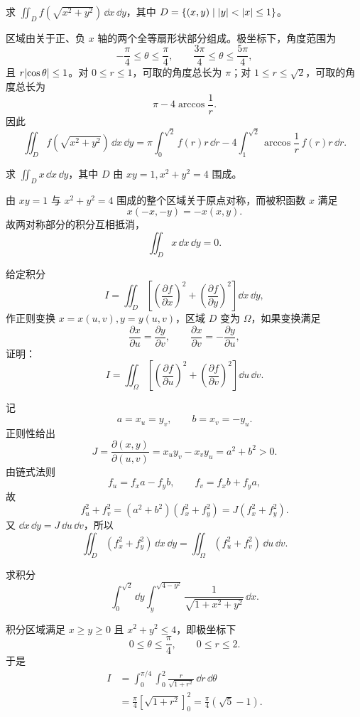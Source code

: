 \begin{xexercise}[11]
求 $\displaystyle\iint_D f(\sqrt{x^2+y^2})\,\dd x\,\dd y$，其中 $D=\{(x,y)\mid\lvert y\rvert<\lvert x\rvert\le1\}$。
\end{xexercise}
\begin{xsolution}
区域由关于正、负 $x$ 轴的两个全等扇形状部分组成。极坐标下，角度范围为
\[
 -\frac\pi4\le\theta\le\frac\pi4,
 \qquad
 \frac{3\pi}{4}\le\theta\le\frac{5\pi}{4},
\]
且 $r\lvert\cos\theta\rvert\le1$。对 $0\le r\le1$，可取的角度总长为 $\pi$；对 $1\le r\le\sqrt2$，可取的角度总长为
\[
  \pi-4\arccos\frac1r.
\]
因此
\[
 \boxed{
 \iint_Df(\sqrt{x^2+y^2})\,\dd x\,\dd y
 =\pi\int_0^{\sqrt2}f(r)r\,\dd r
 -4\int_1^{\sqrt2}\arccos\frac1r\,f(r)r\,\dd r }.
\]
\end{xsolution}


\begin{xexercise}[12]
求 $\displaystyle\iint_D x\,\dd x\,\dd y$，其中 $D$ 由 $xy=1,x^2+y^2=4$ 围成。
\end{xexercise}
\begin{xsolution}
由 $xy=1$ 与 $x^2+y^2=4$ 围成的整个区域关于原点对称，而被积函数 $x$ 满足
\[
  x(-x,-y)=-x(x,y).
\]
故两对称部分的积分互相抵消，
\[
  \boxed{\iint_Dx\,\dd x\,\dd y=0}.
\]
\end{xsolution}


\begin{xexercise}[13]
给定积分
  \[
    I=\iint_D\left[\left(\frac{\partial f}{\partial x}\right)^2+\left(\frac{\partial f}{\partial y}\right)^2\right]\dd x\,\dd y,
  \]
  作正则变换 $x=x(u,v),y=y(u,v)$，区域 $D$ 变为 $\Omega$，如果变换满足
  \[
    \frac{\partial x}{\partial u}=\frac{\partial y}{\partial v},\qquad
    \frac{\partial x}{\partial v}=-\frac{\partial y}{\partial u},
  \]
  证明：
  \[
    I=\iint_\Omega\left[\left(\frac{\partial f}{\partial u}\right)^2+\left(\frac{\partial f}{\partial v}\right)^2\right]\dd u\,\dd v.
  \]
\end{xexercise}
\begin{xsolution}
记
\[
 a=x_u=y_v,
 \qquad b=x_v=-y_u.
\]
正则性给出
\[
 J=\frac{\partial(x,y)}{\partial(u,v)}=x_uy_v-x_vy_u=a^2+b^2>0.
\]
由链式法则
\[
 f_u=f_xa-f_yb,
 \qquad
 f_v=f_xb+f_ya,
\]
故
\[
 f_u^2+f_v^2=(a^2+b^2)(f_x^2+f_y^2)=J(f_x^2+f_y^2).
\]
又 $\dd x\,\dd y=J\,\dd u\,\dd v$，所以
\[
 \iint_D(f_x^2+f_y^2)\,\dd x\,\dd y
 =\iint_\Omega(f_u^2+f_v^2)\,\dd u\,\dd v.
\]
\end{xsolution}


\begin{xexercise}[14]
求积分
  \[
    \int_0^{\sqrt2}\dd y\int_y^{\sqrt{4-y^2}}\frac{1}{\sqrt{1+x^2+y^2}}\,\dd x.
  \]
\end{xexercise}
\begin{xsolution}
积分区域满足 $x\ge y\ge0$ 且 $x^2+y^2\le4$，即极坐标下
\[
 0\le\theta\le\frac\pi4,
 \qquad0\le r\le2.
\]
于是
\begin{align*}
 I&=\int_0^{\pi/4}\int_0^2\frac{r}{\sqrt{1+r^2}}\,\dd r\,\dd\theta\\
 &=\frac\pi4\left[\sqrt{1+r^2}\right]_0^2
 =\boxed{\frac\pi4(\sqrt5-1)}.
\end{align*}
\end{xsolution}


